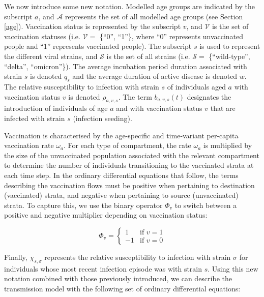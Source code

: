 We now introduce some new notation. Modelled age groups are indicated by the subscript $a$, and $\mathcal{A}$ represents
the set of all modelled age groups (see Section \ref{age}). Vaccination status is represented by the subscript $v$, and $\mathcal{V}$ is the set of 
vaccination statuses (i.e. $\mathcal{V}=$ \{``0'', ``1''\}, where ``0'' represents unvaccinated people and ``1'' represents vaccinated people).
The subscript $s$ is used to represent the different viral strains, and $\mathcal{S}$ is the set 
of all strains (i.e. $\mathcal{S}=$ \{``wild-type'', ``delta'', ``omicron''\}). The average incubation period duration associated with strain $s$ is denoted $q_s$ and
the average duration of active disease is denoted $w$. The relative susceptibility to infection with strain $s$ of individuals aged $a$ with 
vaccination status $v$ is denoted $\rho_{a,v,s}$. The term $b_{a,v,s}(t)$ designates the introduction of individuals of age $a$ and 
with vaccination status $v$ that are infected with strain $s$ (infection seeding). 

Vaccination is characterised by the age-specific and time-variant per-capita vaccination rate $\omega_a$. 
For each type of compartment, the rate $\omega_a$ is multiplied by the size of the unvaccinated population associated with the relevant 
compartment to determine the number of individuals transitioning to the vaccinated strata at each time step. 
In the ordinary differential equations that follow, the terms describing the vaccination flows must be positive when pertaining to destination (vaccinated)
strata, and negative when pertaining to source (unvaccinated) strata. To capture this, we use the binary operator $\Phi_v$ to switch between a positive and negative multiplier 
depending on vaccination status:

\[
\Phi_v =
\begin{cases} 
1 & \text{if } v=1 \\
-1 & \text{if } v=0
\end{cases}
\]

Finally, $\chi_{s,\sigma}$ represents the relative susceptibility to infection
with strain $\sigma$ for individuals whose most recent infection episode was with strain $s$. Using this new notation combined 
with those previously introduced, we can describe the transmission model with the following set of ordinary differential equations:

